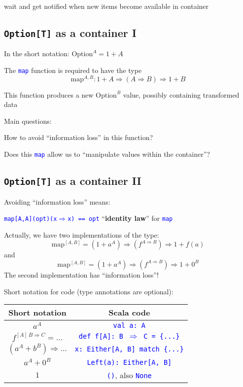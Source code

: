 wait and get notified when new items become available in container


\subsection{\texttt{Option{[}T{]}} as a container I}

In the short notation: $\text{Option}^{A}=1+A$

The \texttt{\textcolor{blue}{\footnotesize{}map}} function is required
to have the type
\[
\text{map}^{A,B}:1+A\Rightarrow\left(A\Rightarrow B\right)\Rightarrow1+B
\]

This function produces a new $\text{Option}^{B}$ value, possibly
containing transformed data

Main questions:

How to avoid ``information loss'' in this function?

Does this \texttt{\textcolor{blue}{\footnotesize{}map}} allow us to
``manipulate values within the container''?


\subsection{\texttt{Option{[}T{]}} as a container II}

Avoiding ``information loss'' means:

\texttt{\textcolor{blue}{\footnotesize{}map{[}A,A{]}(opt)(x$\Rightarrow$x)
== opt}} \textendash{} ``\textbf{identity law}'' for \texttt{\textcolor{blue}{\footnotesize{}map}}{\footnotesize\par}

Actually, we have two implementations of the type: 
\[
\text{map}^{[A,B]}=(1+a^{A})\Rightarrow(f^{A\Rightarrow B})\Rightarrow1+f(a)
\]
and
\[
\text{map}^{[A,B]}=(1+a^{A})\Rightarrow(f^{A\Rightarrow B})\Rightarrow1+0^{B}
\]
The second implementation has ``information loss''!

Short notation for code (type annotations are optional):
\begin{center}
\begin{tabular}{|c|c|}
\hline 
\textbf{Short notation} & \textbf{Scala code}\tabularnewline
\hline 
\hline 
$a^{A}$ & \texttt{\textcolor{blue}{\footnotesize{}val a: A}}\tabularnewline
\hline 
$f^{[A]\,B\Rightarrow C}=...$ & \texttt{\textcolor{blue}{\footnotesize{}def f{[}A{]}: B $\Rightarrow$
C = \{...\}}}\tabularnewline
\hline 
$(a^{A}+b^{B})\Rightarrow...$ & \texttt{\textcolor{blue}{\footnotesize{}x: Either{[}A, B{]} match
\{...\}}}\tabularnewline
\hline 
$a^{A}+0^{B}$ & \texttt{\textcolor{blue}{\footnotesize{}Left(a):\ Either{[}A, B{]}}}\tabularnewline
\hline 
$1$ & \texttt{\textcolor{blue}{\footnotesize{}()}}, also \texttt{\textcolor{blue}{\footnotesize{}None}}\tabularnewline
\hline 
\end{tabular}
\par\end{center}



